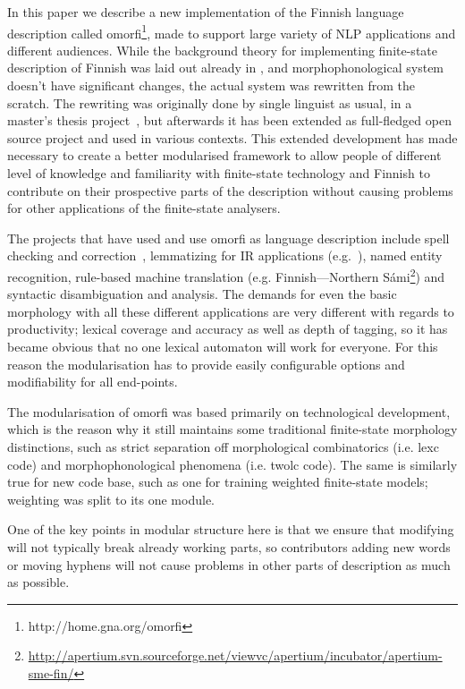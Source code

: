 \documentclass[postprint]{flammie}
\begin{document}
In this paper we describe a new implementation of the Finnish language
description called omorfi\footnote{http://home.gna.org/omorfi}, made to support
large variety of NLP applications and different audiences.  While the
background theory for implementing finite-state description of Finnish was laid
out already in \cite{koskenniemi/1983}, and morphophonological system
doesn't have significant changes, the actual system was rewritten from the
scratch. The rewriting was originally done by single linguist as usual, in a
master's thesis project~\cite{pirinen/2008}, but afterwards it has been
extended as full-fledged open source project and used in various contexts. This
extended development has made necessary to create a better modularised
framework to allow people of different level of knowledge and familiarity with
finite-state technology and Finnish to contribute on their prospective parts of
the description without causing problems for other applications of the
finite-state analysers.

The projects that have used and use omorfi as language description include
spell checking and correction~\cite{pirinen/2010/lrec}, lemmatizing for IR
applications (e.g.~\cite{kurola/2010}), named entity recognition, rule-based
machine translation (e.g. Finnish---Northern
Sámi\footnote{\url{http://apertium.svn.sourceforge.net/viewvc/apertium/incubator/apertium-sme-fin/}})
and syntactic disambiguation and analysis. The demands for even the basic
morphology with all these different applications are very different with
regards to productivity; lexical coverage and accuracy as well as depth of
tagging, so it has became obvious that no one lexical automaton will work for
everyone.  For this reason the modularisation has to provide easily
configurable options and modifiability for all end-points.

The modularisation of omorfi was based primarily on technological development,
which is the reason why it still maintains some traditional finite-state
morphology distinctions, such as strict separation off morphological
combinatorics (i.e. lexc code) and morphophonological phenomena (i.e.
twolc code). The same is similarly true for new code base, such as one for
training weighted finite-state models; weighting was split to its one
module.

One of the key points in modular structure here is that we ensure that modifying
will not typically break already working parts, so contributors adding new words
or moving hyphens will not cause problems in other parts of description
as much as possible.
\end{document}
